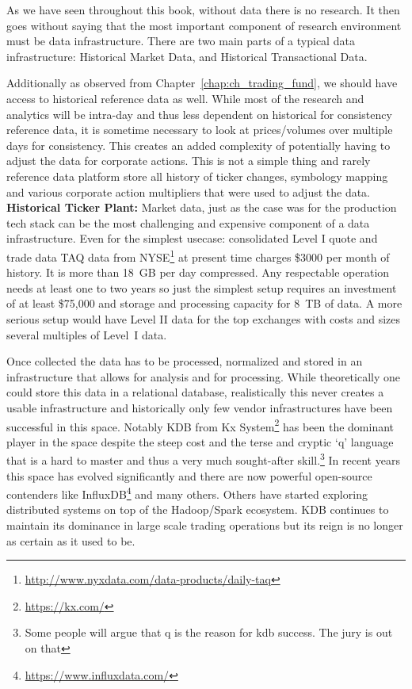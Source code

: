 As we have seen throughout this book, without data there is no research. It then goes without saying that the most important component of research environment must be data infrastructure. There are two main parts of a typical data infrastructure: Historical Market Data, and Historical Transactional Data. 


Additionally as observed from Chapter~\ref{chap:ch_trading_fund}, we should have access to historical reference data as well. While most of the research and analytics will be intra-day and thus less dependent on historical for consistency reference data, it is sometime necessary to look at prices/volumes over multiple days for consistency. This creates an added complexity of potentially having to adjust the data for corporate actions. This is not a simple thing and rarely reference data platform store all history of ticker changes, symbology mapping and various corporate action multipliers that were used to adjust the data. \\


\noindent\textbf{Historical Ticker Plant:} Market data, just as the case was for the production tech stack can be the most challenging and expensive component of a data infrastructure. Even for  the simplest usecase: consolidated Level I quote and trade data TAQ data from NYSE\footnote{\url{http://www.nyxdata.com/data-products/daily-taq}} at present time charges \$3000 per month of history. It is more than 18~GB per day compressed. Any respectable operation needs at least one to two years so just the simplest setup requires an investment of at least \$75,000 and storage and processing capacity for 8~TB of data. A more serious setup would have Level II data for the top exchanges with costs and sizes several multiples of Level~I data.  


Once collected the data has to be processed, normalized and stored in an infrastructure that allows for analysis and for processing. While theoretically one could store this data in a relational database, realistically this never creates a usable infrastructure and historically only few vendor infrastructures have been successful in this space. Notably KDB from Kx System\footnote{\url{https://kx.com/}} has been the dominant player in the space despite the steep cost and the terse and cryptic `q' language that is a hard to master and thus a very much sought-after skill.\footnote{Some people will argue that q is the reason for kdb success. The jury is out on that} In recent years this space has evolved significantly and there are now powerful open-source contenders like InfluxDB\footnote{\url{https://www.influxdata.com/}} and many others. Others have started exploring distributed systems on top of the Hadoop/Spark ecosystem. KDB continues to maintain its dominance in large scale trading operations but its reign is no longer as certain as it used to be.


